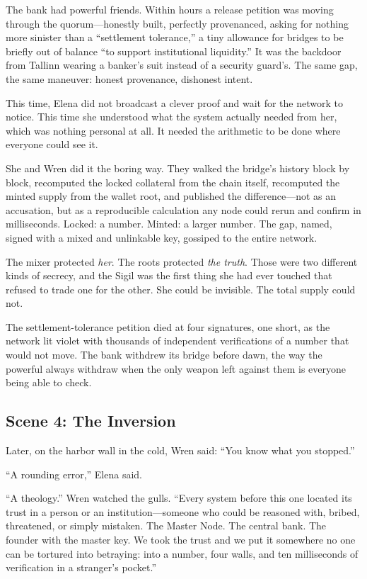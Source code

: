 The bank had powerful friends. Within hours a release petition was moving
through the quorum---honestly built, perfectly provenanced, asking for nothing
more sinister than a ``settlement tolerance,'' a tiny allowance for bridges to
be briefly out of balance ``to support institutional liquidity.'' It was the
backdoor from Tallinn wearing a banker's suit instead of a security guard's. The
same gap, the same maneuver: honest provenance, dishonest intent.

This time, Elena did not broadcast a clever proof and wait for the network to
notice. This time she understood what the system actually needed from her, which
was nothing personal at all. It needed the arithmetic to be done where everyone
could see it.

She and Wren did it the boring way. They walked the bridge's history block by
block, recomputed the locked collateral from the chain itself, recomputed the
minted supply from the wallet root, and published the difference---not as an
accusation, but as a reproducible calculation any node could rerun and confirm in
milliseconds. Locked: a number. Minted: a larger number. The gap, named, signed
with a mixed and unlinkable key, gossiped to the entire network.

The mixer protected \emph{her}. The roots protected \emph{the truth}. Those were
two different kinds of secrecy, and the Sigil was the first thing she had ever
touched that refused to trade one for the other. She could be invisible. The
total supply could not.

The settlement-tolerance petition died at four signatures, one short, as the
network lit violet with thousands of independent verifications of a number that
would not move. The bank withdrew its bridge before dawn, the way the powerful
always withdraw when the only weapon left against them is everyone being able to
check.

\hypertarget{scene-4-the-inversion}{%
\subsection{Scene 4: The
Inversion}\label{scene-4-the-inversion}}

Later, on the harbor wall in the cold, Wren said: ``You know what you stopped.''

``A rounding error,'' Elena said.

``A theology.'' Wren watched the gulls. ``Every system before this one located
its trust in a person or an institution---someone who could be reasoned with,
bribed, threatened, or simply mistaken. The Master Node. The central bank. The
founder with the master key. We took the trust and we put it somewhere no one
can be tortured into betraying: into a number, four walls, and ten milliseconds
of verification in a stranger's pocket.''


